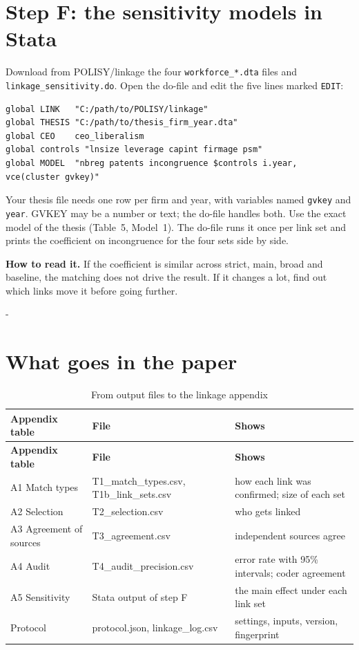 \documentclass[11pt,a4paper]{article}
\makeatletter
\newcommand{\file}[1]{\texttt{#1}}
\newcommand{\condbreak}[1]{\par\penalty-100\begingroup\setlength{\dimen@}{#1}\dimen@ii\pagegoal
  \advance\dimen@ii-\pagetotal\ifdim\dimen@>\dimen@ii\ifdim\dimen@ii>\z@\vfil\fi\break\fi\endgroup}
\makeatother
\begin{document}
\section{Step F: the sensitivity models in Stata}\label{sec:stata}

Download from POLISY/linkage the four \file{workforce\_*.dta} files and \file{linkage\_sensitivity.do}. Open the do-file and edit the five lines marked \texttt{EDIT}:
\begin{lstlisting}
global LINK   "C:/path/to/POLISY/linkage"
global THESIS "C:/path/to/thesis_firm_year.dta"
global CEO    ceo_liberalism
global controls "lnsize leverage capint firmage psm"
global MODEL  "nbreg patents incongruence $controls i.year, vce(cluster gvkey)"
\end{lstlisting}
Your thesis file needs one row per firm and year, with variables named \texttt{gvkey} and \texttt{year}. GVKEY may be a number or text; the do-file handles both. Use the exact model of the thesis (Table~5, Model~1). The do-file runs it once per link set and prints the coefficient on incongruence for the four sets side by side.

\textbf{How to read it.} If the coefficient is similar across strict, main, broad and baseline, the matching does not drive the result. If it changes a lot, find out which links move it before going further.

\condbreak{16\baselineskip}\section{What goes in the paper}\label{sec:paper}

\begin{longtable}{@{}L{4.6cm}L{4.2cm}L{6.2cm}@{}}
\caption{From output files to the linkage appendix}\label{tab:paper}\\
\toprule
\textbf{Appendix table} & \textbf{File} & \textbf{Shows}\\
\midrule\endfirsthead
\toprule
\textbf{Appendix table} & \textbf{File} & \textbf{Shows}\\
\midrule\endhead
\bottomrule\endfoot
A1 Match types & T1\_match\_types.csv, T1b\_link\_sets.csv & how each link was confirmed; size of each set\\
A2 Selection & T2\_selection.csv & who gets linked\\
A3 Agreement of sources & T3\_agreement.csv & independent sources agree\\
A4 Audit & T4\_audit\_precision.csv & error rate with 95\% intervals; coder agreement\\
A5 Sensitivity & Stata output of step F & the main effect under each link set\\
Protocol & protocol.json, linkage\_log.csv & settings, inputs, version, fingerprint\\
\end{longtable}
\end{document}
